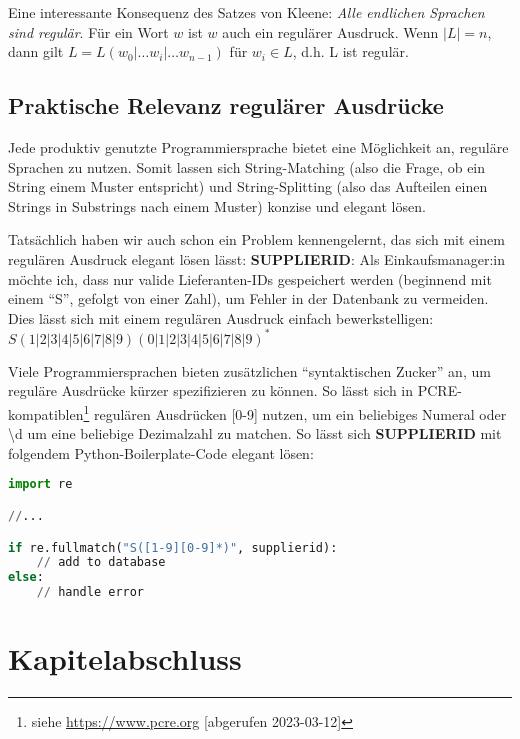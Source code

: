 Eine interessante Konsequenz des Satzes von Kleene:
\emph{Alle endlichen Sprachen sind regulär}.
Für ein Wort $w$ ist $w$ auch ein regulärer Ausdruck.
Wenn $|L| = n$, dann gilt $L = L(w_0|\dots{}w_i|\dots{}w_{n-1})$ für $w_i \in L$, d.h. L ist regulär.

\subsection{Praktische Relevanz regulärer Ausdrücke}

Jede produktiv genutzte Programmiersprache bietet eine Möglichkeit an,
reguläre Sprachen zu nutzen.
Somit lassen sich String-Matching (also die Frage, ob ein String einem Muster entspricht)
und String-Splitting (also das Aufteilen einen Strings in Substrings nach einem Muster)
konzise und elegant lösen.

Tatsächlich haben wir auch schon ein Problem kennengelernt,
das sich mit einem regulären Ausdruck elegant lösen lässt: \textbf{SUPPLIERID}:
Als Einkaufsmanager:in möchte ich,
        dass nur valide Lieferanten-IDs gespeichert werden
        (beginnend mit einem ``S'', gefolgt von einer Zahl),
        um Fehler in der Datenbank zu vermeiden.
Dies lässt sich mit einem regulären Ausdruck einfach bewerkstelligen:
$S(1|2|3|4|5|6|7|8|9)(0|1|2|3|4|5|6|7|8|9)^*$

Viele Programmiersprachen bieten zusätzlichen ``syntaktischen Zucker'' an,
um reguläre Ausdrücke kürzer spezifizieren zu können.
So lässt sich in PCRE-kompatiblen\footnote{
    siehe \href{https://www.pcre.org/}{https://www.pcre.org} [abgerufen 2023-03-12]}
regulären Ausdrücken [0-9] nutzen, um ein beliebiges Numeral 
oder \textbackslash{}d um eine beliebige Dezimalzahl zu matchen.
So lässt sich \textbf{SUPPLIERID} mit folgendem Python-Boilerplate-Code elegant lösen:

\begin{lstlisting}[language=Python, caption=Python-Boilerplate für \textbf{SUPPLIERID}]
import re

//...

if re.fullmatch("S([1-9][0-9]*)", supplierid):
    // add to database
else:
    // handle error
\end{lstlisting}

\section*{Kapitelabschluss}
